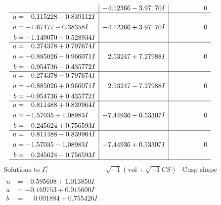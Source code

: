 \documentclass[1p]{elsarticle_modified}
\theoremstyle{definition}
\newcommand{\I}{\sqrt{-1}}
\begin{document}
$$\begin{array}{c|c|c}
 & -4.12366 - 3.97170 I & \phantom{-0.000000 } 0 \\ \hline\begin{aligned}
u &= \phantom{-}0.115228 - 0.839112 I \\
a &= -1.67477 - 0.38358 I \\
b &= -1.149070 - 0.528934 I\end{aligned}
 & -4.12366 + 3.97170 I & \phantom{-0.000000 } 0 \\ \hline\begin{aligned}
u &= \phantom{-}0.274378 + 0.797674 I \\
a &= -0.885026 - 0.966071 I \\
b &= -0.954736 - 0.435772 I\end{aligned}
 & \phantom{-}2.53247 + 7.27988 I & \phantom{-0.000000 } 0 \\ \hline\begin{aligned}
u &= \phantom{-}0.274378 - 0.797674 I \\
a &= -0.885026 + 0.966071 I \\
b &= -0.954736 + 0.435772 I\end{aligned}
 & \phantom{-}2.53247 - 7.27988 I & \phantom{-0.000000 } 0 \\ \hline\begin{aligned}
u &= \phantom{-}0.811488 + 0.839964 I \\
a &= -1.57035 + 1.08983 I \\
b &= \phantom{-}0.245624 + 0.756593 I\end{aligned}
 & -7.44936 - 0.53307 I & \phantom{-0.000000 } 0 \\ \hline\begin{aligned}
u &= \phantom{-}0.811488 - 0.839964 I \\
a &= -1.57035 - 1.08983 I \\
b &= \phantom{-}0.245624 - 0.756593 I\end{aligned}
 & -7.44936 + 0.53307 I & \phantom{-0.000000 } 0\\
 \hline 
 \end{array}$$\newpage$$\begin{array}{c|c|c}  
\text{Solutions to }I^u_{1}& \I (\text{vol} + \sqrt{-1}CS) & \text{Cusp shape}\\
 \hline 
\begin{aligned}
u &= -0.595608 + 1.013850 I \\
a &= -0.169753 + 0.015600 I \\
b &= \phantom{-}0.001884 + 0.755426 I\end{aligned}

\end{array}$$
\end{document}

